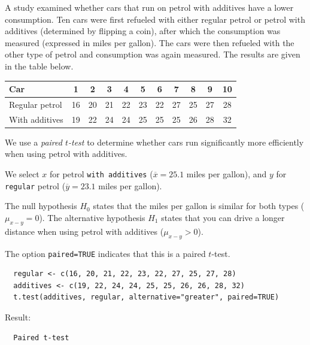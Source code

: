 \begin{example}
  A study examined whether cars that run on petrol with additives have a lower consumption. Ten cars were first refueled with either regular petrol or petrol with additives (determined by flipping a coin), after which the consumption was measured (expressed in miles per gallon). The cars were then refueled with the other type of petrol and consumption was again measured. The results are given in the table below.
  
  \begin{center}
    \begin{tabular}{|l|c|c|c|c|c|c|c|c|c|c|}
      \hline 
      Car & 1 & 2 & 3 & 4 & 5 & 6 & 7 & 8 & 9 & 10 \\ 
      \hline 
      Regular petrol & 16 & 20 & 21 & 22 & 23 & 22 & 27 & 25 & 27 & 28 \\ 
      \hline 
      With additives & 19 & 22 & 24 & 24 & 25 & 25 & 25 & 26 & 28 & 32 \\ 
      \hline 
    \end{tabular} 
  \end{center}
  
  We use a \emph {paired $t$-test} to determine whether cars run significantly more efficiently when using petrol with additives.
  
  We select $x$ for petrol \texttt{with additives} ($\overline{x}=25.1$ miles per gallon), and $y$ for \texttt{regular} petrol ($\overline{y}=23.1$ miles per gallon).
  
  The null hypothesis $H_0$ states that the miles per gallon is similar for both types ($\mu_{x-y}=0$).
  The alternative hypothesis $H_1$ states that you can drive a longer distance when using petrol with additives ($\mu_{x-y}>0$).
  
  The option \texttt{paired=TRUE} indicates that this is a paired $t$-test.
  
  \begin{lstlisting}
  regular <- c(16, 20, 21, 22, 23, 22, 27, 25, 27, 28)
  additives <- c(19, 22, 24, 24, 25, 25, 26, 26, 28, 32)
  t.test(additives, regular, alternative="greater", paired=TRUE)
  \end{lstlisting}
  
  Result:
  
  \begin{verbatim}
  Paired t-test
  

\end{verbatim}
\end{example}
